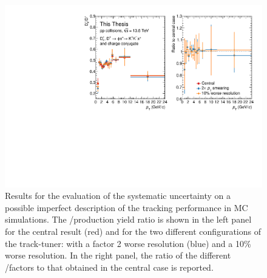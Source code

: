 \begin{figure}[htb]
    \begin{center}
    \includegraphics[width=\textwidth]{Figures/Chapter 6/TrackTunerSyst.pdf}
    \caption{Results for the evaluation of the systematic uncertainty on a possible imperfect description of the tracking performance in MC simulations. The \ds/\dpl production yield ratio is shown in the left panel for the central result (red) and for the two different configurations of the track-tuner: with a factor 2 worse \pt resolution (blue) and a 10\% worse resolution. In the right panel, the ratio of the different \ds/\dpl factors to that obtained in the central case is reported.} 
    \label{fig:tracktuner} 
    \end{center}
\end{figure}

